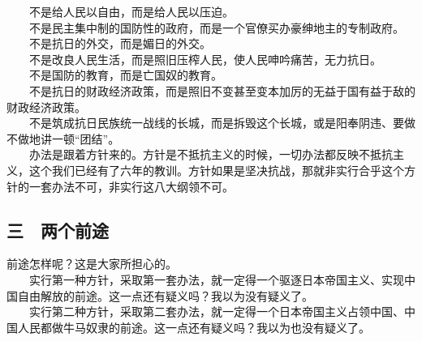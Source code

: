 \documentclass[cn,11pt,chinese]{elegantbook}
\def\myformat#1{\hfil\hfil #1}
\begin{document}
　　不是给人民以自由，而是给人民以压迫。\\
　　不是民主集中制的国防性的政府，而是一个官僚买办豪绅地主的专制政府。\\
　　不是抗日的外交，而是媚日的外交。\\
　　不是改良人民生活，而是照旧压榨人民，使人民呻吟痛苦，无力抗日。\\
　　不是国防的教育，而是亡国奴的教育。\\
　　不是抗日的财政经济政策，而是照旧不变甚至变本加厉的无益于国有益于敌的财政经济政策。\\
　　不是筑成抗日民族统一战线的长城，而是拆毁这个长城，或是阳奉阴违、要做不做地讲一顿“团结”。\\
　　办法是跟着方针来的。方针是不抵抗主义的时候，一切办法都反映不抵抗主义，这个我们已经有了六年的教训。方针如果是坚决抗战，那就非实行合乎这个方针的一套办法不可，非实行这八大纲领不可。\\
\subsection*{\myformat{三　两个前途}}
前途怎样呢？这是大家所担心的。\\
　　实行第一种方针，采取第一套办法，就一定得一个驱逐日本帝国主义、实现中国自由解放的前途。这一点还有疑义吗？我以为没有疑义了。\\
　　实行第二种方针，采取第二套办法，就一定得一个日本帝国主义占领中国、中国人民都做牛马奴隶的前途。这一点还有疑义吗？我以为也没有疑义了。\\
\end{document}

